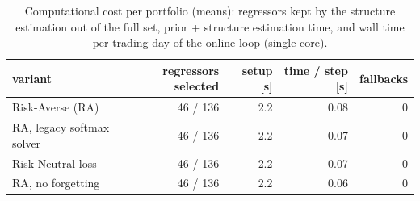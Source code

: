\begin{table}[ht!]
\centering
\small
\setlength{\tabcolsep}{4pt}
\begin{tabular}{lrrrr}
\hline
variant & regressors selected & setup [s] & time / step [s] & fallbacks \\
\hline
Risk-Averse (RA) & 46 / 136 & 2.2 & 0.08 & 0 \\
RA, legacy softmax solver & 46 / 136 & 2.2 & 0.07 & 0 \\
Risk-Neutral loss & 46 / 136 & 2.2 & 0.07 & 0 \\
RA, no forgetting & 46 / 136 & 2.2 & 0.06 & 0 \\
\hline
\end{tabular}
\caption{Computational cost per portfolio (means): regressors kept by the structure estimation out of the full set, prior + structure estimation time, and wall time per trading day of the online loop (single core).}
\label{tab:runtime_covid}
\end{table}
